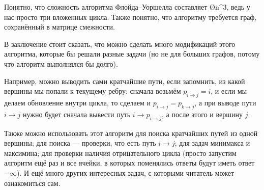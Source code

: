 Понятно, что сложность алгоритма Флойда–Уоршелла составляет \O{n^3}, ведь у нас просто три вложенных цикла. Также понятно, что алгоритму требуется граф, сохранённый в матрице смежности.

В заключение стоит сказать, что можно сделать много модификаций этого алгоритма, которые бы решали разные задачи (но не для больших графов, потому что алгоритм выполнялся бы долго).

Например, можно выводить сами кратчайшие пути, если запомнить, из какой вершины мы попали к текущему ребру: сначала возьмём $p_{i \to j} = i$, и если мы делаем обновление внутри цикла, то сделаем и $p_{i \to j} = p_{k \to j}$, а при выводе пути $i \to j$ нужно будет сначала вывести путь $i \to p_{i \to j}$, а после этого и вершину $j$.

Также можно использовать этот алгоритм для поиска кратчайших путей из одной вершины; для поиска  — проверки, что есть путь $i \to j$; для задач минимакса и максимина; для проверки наличия отрицательного цикла (просто запустим алгоритм ещё раз и все ячейки, в которых поменялись ответы будут иметь ответ $-\infty$). И ещё много других интересных задач, с которыми читатель может ознакомиться сам.
